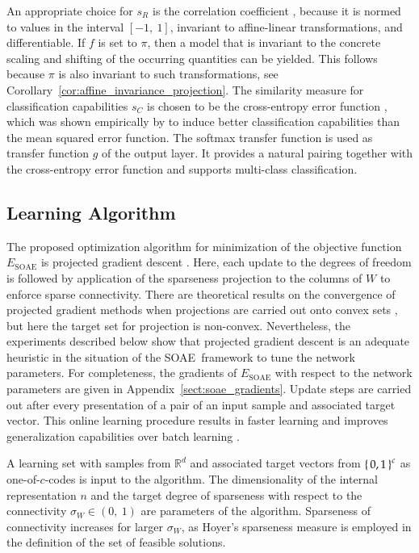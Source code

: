 \documentclass[twoside,11pt]{article}
\DeclareMathOperator{\SOAE}{SOAE}
\newcommand{\intervalcc}[2]{\left[#1,\ #2\right]}
\newcommand{\intervaloo}[2]{\left(#1,\ #2\right)}
\newcommand{\R}{\mathbb{R}}
\newcommand{\0}{\mathcal{O}}
\begin{document}
An appropriate choice for $s_R$ is the correlation coefficient \citep[see for example][]{Rodgers1988},
because it is normed to values in the interval $\intervalcc{-1}{1}$, invariant to affine-linear transformations, and differentiable.
If $f$ is set to $\pi$, then a model that is invariant to the concrete scaling and shifting of the occurring quantities can be yielded.
This follows because $\pi$ is also invariant to such transformations, see Corollary~\ref{cor:affine_invariance_projection}.
The similarity measure for classification capabilities $s_C$ is chosen to be the cross-entropy error function \citep{Bishop1995}, which was shown empirically by \citet{Simard2003} to induce better classification capabilities than the mean squared error function.
The softmax transfer function \citep{Bishop1995} is used as transfer function $g$ of the output layer.
It provides a natural pairing together with the cross-entropy error function \citep{Dunne1997} and supports multi-class classification.

\subsection{Learning Algorithm}
\label{sect:soae_learning_algorithm}
The proposed optimization algorithm for minimization of the objective function $E_{\SOAE}$ is projected gradient descent \citep{Bertsekas1999}.
Here, each update to the degrees of freedom is followed by application of the sparseness projection to the columns of $W$ to enforce sparse connectivity.
There are theoretical results on the convergence of projected gradient methods when projections are carried out onto convex sets \citep{Bertsekas1999}, but here the target set for projection is non-convex.
Nevertheless, the experiments described below show that projected gradient descent is an adequate heuristic in the situation of the SOAE~framework to tune the network parameters.
For completeness, the gradients of $E_{\SOAE}$ with respect to the network parameters are given in Appendix~\ref{sect:soae_gradients}.
Update steps are carried out after every presentation of a pair of an input sample and associated target vector.
This online learning procedure results in faster learning and improves generalization capabilities over batch learning \citep{Wilson2003,Bottou2004}.

A learning set with samples from $\R^d$ and associated target vectors from $\set{0,1}^c$ as one-of-$c$-codes is input to the algorithm.
The dimensionality of the internal representation $n$ and the target degree of sparseness with respect to the connectivity $\sigma_W\in\intervaloo{0}{1}$ are parameters of the algorithm.
Sparseness of connectivity increases for larger $\sigma_W$, as Hoyer's sparseness measure is employed in the definition of the set of feasible solutions.
\end{document}
